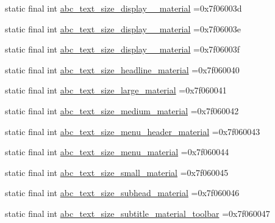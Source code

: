 \begin{DoxyCompactItemize}
\item 
static final int \mbox{\hyperlink{classbr_1_1unb_1_1cic_1_1mp_1_1marketmaster_1_1test_1_1R_1_1dimen_ac99943bced67b279d562b385819beac8}{abc\+\_\+text\+\_\+size\+\_\+display\+\_\+\_\+material}} =0x7f06003d
\item 
static final int \mbox{\hyperlink{classbr_1_1unb_1_1cic_1_1mp_1_1marketmaster_1_1test_1_1R_1_1dimen_a081fbbbc49ffb00ab2332e446a95b66a}{abc\+\_\+text\+\_\+size\+\_\+display\+\_\+\_\+material}} =0x7f06003e
\item 
static final int \mbox{\hyperlink{classbr_1_1unb_1_1cic_1_1mp_1_1marketmaster_1_1test_1_1R_1_1dimen_a144ff3b033fe9b6cef6e2624ba0b805a}{abc\+\_\+text\+\_\+size\+\_\+display\+\_\+\_\+material}} =0x7f06003f
\item 
static final int \mbox{\hyperlink{classbr_1_1unb_1_1cic_1_1mp_1_1marketmaster_1_1test_1_1R_1_1dimen_a0da272ff0cda22774d513f336b2cbbe8}{abc\+\_\+text\+\_\+size\+\_\+headline\+\_\+material}} =0x7f060040
\item 
static final int \mbox{\hyperlink{classbr_1_1unb_1_1cic_1_1mp_1_1marketmaster_1_1test_1_1R_1_1dimen_aceeb6ad8250208c6d3a5e08cab2c0719}{abc\+\_\+text\+\_\+size\+\_\+large\+\_\+material}} =0x7f060041
\item 
static final int \mbox{\hyperlink{classbr_1_1unb_1_1cic_1_1mp_1_1marketmaster_1_1test_1_1R_1_1dimen_ab9512df9b92efe255af9d2e2eb2544f8}{abc\+\_\+text\+\_\+size\+\_\+medium\+\_\+material}} =0x7f060042
\item 
static final int \mbox{\hyperlink{classbr_1_1unb_1_1cic_1_1mp_1_1marketmaster_1_1test_1_1R_1_1dimen_a1cab14cbb646f65036713100bce37781}{abc\+\_\+text\+\_\+size\+\_\+menu\+\_\+header\+\_\+material}} =0x7f060043
\item 
static final int \mbox{\hyperlink{classbr_1_1unb_1_1cic_1_1mp_1_1marketmaster_1_1test_1_1R_1_1dimen_a7ecf0f67aaa67db4a39e779545fe4214}{abc\+\_\+text\+\_\+size\+\_\+menu\+\_\+material}} =0x7f060044
\item 
static final int \mbox{\hyperlink{classbr_1_1unb_1_1cic_1_1mp_1_1marketmaster_1_1test_1_1R_1_1dimen_ab4b39890d4c8fb76c0c2e44d5fcc0fd3}{abc\+\_\+text\+\_\+size\+\_\+small\+\_\+material}} =0x7f060045
\item 
static final int \mbox{\hyperlink{classbr_1_1unb_1_1cic_1_1mp_1_1marketmaster_1_1test_1_1R_1_1dimen_aec1df95dd408886f7f0103e18879862c}{abc\+\_\+text\+\_\+size\+\_\+subhead\+\_\+material}} =0x7f060046
\item 
static final int \mbox{\hyperlink{classbr_1_1unb_1_1cic_1_1mp_1_1marketmaster_1_1test_1_1R_1_1dimen_ac5598242c4c35ed2c358ea9280d32234}{abc\+\_\+text\+\_\+size\+\_\+subtitle\+\_\+material\+\_\+toolbar}} =0x7f060047

\end{DoxyCompactItemize}

